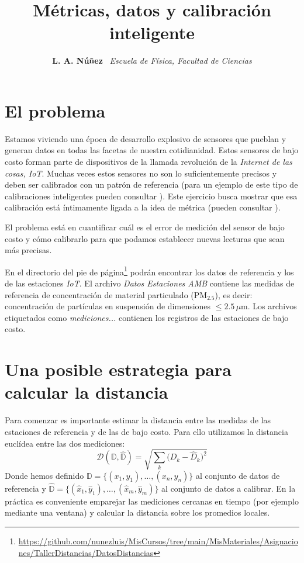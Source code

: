 \documentclass[spanish,notitlepage,letterpaper,12pt]{article} %
\title{Métricas, datos y calibración inteligente}
\author{
\textbf{L. A. Núñez} \
\textit{Escuela de Física, Facultad de Ciencias}
}
\date{}
\begin{document}
\maketitle

\section{El problema}
Estamos viviendo una época de desarrollo explosivo de sensores que pueblan y generan datos en todas las facetas de nuestra cotidianidad. Estos sensores de bajo costo forman parte de dispositivos de la llamada revolución de la \textit{Internet de las cosas, IoT}. Muchas veces estos sensores no son lo suficientemente precisos y deben ser calibrados con un patrón de referencia (para un ejemplo de este tipo de calibraciones inteligentes pueden consultar \cite{ZimmermanEtal2018}).
Este ejercicio busca mostrar que esa calibración está íntimamente ligada a la idea de métrica (pueden consultar \cite{Colombo2020}).

El problema está en cuantificar cuál es el error de medición del sensor de bajo costo y cómo calibrarlo para que podamos establecer nuevas lecturas que sean más precisas.

En el directorio del pie de página\footnote{\url{https://github.com/nunezluis/MisCursos/tree/main/MisMateriales/Asignaciones/TallerDistancias/DatosDistancias}} podrán encontrar los datos de referencia y los de las estaciones \textit{IoT}. El archivo \textit{Datos Estaciones AMB} contiene las medidas de referencia de concentración de material particulado ($\mathrm{PM}_{2.5}$), es decir: concentración de partículas en suspensión de dimensiones $\leq 2.5\,\mu\mathrm{m}$. Los archivos etiquetados como \textit{mediciones...} contienen los registros de las estaciones de bajo costo.

\section{Una posible estrategia para calcular la distancia}
Para comenzar es importante estimar la distancia entre las medidas de las estaciones de referencia y de las de bajo costo. Para ello utilizamos la distancia euclídea entre las dos mediciones:
\begin{equation}
\mathcal{D}(\mathbb{D}, \hat{\mathbb{D}} ) = \sqrt{ \sum_{k} \bigl( D_{k} - \hat{D}_{k} \bigr)^{2} }\label{Distancia}
\end{equation}
Donde hemos definido $\mathbb{D}=\{(x_{1},y_{1}),\dots,(x_{n},y_{n})\}$ al conjunto de datos de referencia y $\hat{\mathbb{D}}=\{(\hat{x}_{1},\hat{y}_{1}),\dots,(\hat{x}_{m},\hat{y}_{m})\}$ al conjunto de datos a calibrar. En la práctica es conveniente emparejar las mediciones cercanas en tiempo (por ejemplo mediante una ventana) y calcular la distancia sobre los promedios locales.
\end{document}
